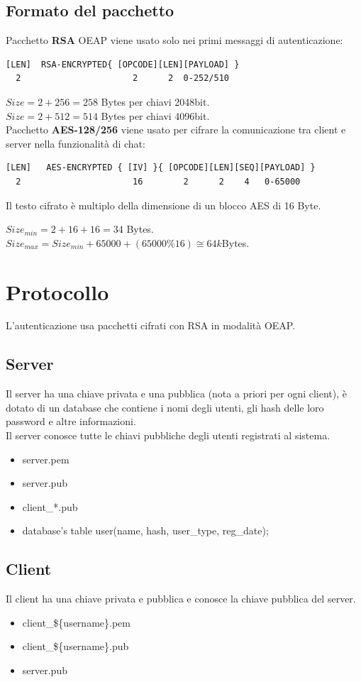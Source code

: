 \documentclass[a4paper,titlepage]{article}
\begin{document}
\subsection{Formato del pacchetto}

Pacchetto \textbf{RSA} OEAP viene usato solo nei primi messaggi di autenticazione:
{\color{red} \begin{verbatim}
[LEN]  RSA-ENCRYPTED{ [OPCODE][LEN][PAYLOAD] }
  2                      2      2  0-252/510
\end{verbatim}}
$Size = 2 + 256= 258$ Bytes per chiavi 2048bit.\\
$Size = 2 + 512= 514$ Bytes per chiavi 4096bit.\\

Pacchetto \textbf{AES-128/256} viene usato per cifrare la comunicazione tra client e server nella funzionalità di chat:
{\color{red} \begin{verbatim}
[LEN]   AES-ENCRYPTED { [IV] }{ [OPCODE][LEN][SEQ][PAYLOAD] }
  2                      16        2      2    4   0-65000
\end{verbatim} }
Il testo cifrato è multiplo della dimensione di un blocco AES di 16 Byte.

$Size_{min} = 2 + 16 + 16 = 34$ Bytes.\\
$Size_{max} = Size_{min} + 65000 + ( 65000 \% 16 ) \cong 64k$Bytes.

\section{Protocollo}
L'autenticazione usa pacchetti cifrati con RSA in modalità OEAP.
\subsection{Server}
Il server ha una chiave privata e una pubblica (nota a priori per ogni client), è dotato di un database che contiene i nomi degli utenti, gli hash delle loro password e altre informazioni.\\
Il server conosce tutte le chiavi pubbliche degli utenti registrati al sistema.
\begin{itemize}
\item server.pem
\item server.pub
\item client\_*.pub
\item database's table user(name, hash, user\_type, reg\_date);
\end{itemize}

\subsection{Client}
Il client ha una chiave privata e pubblica e conosce la chiave pubblica del server.
\begin{itemize}
\item client\_\$\{username\}.pem
\item client\_\$\{username\}.pub
\item server.pub
\end{itemize}
\end{document}
